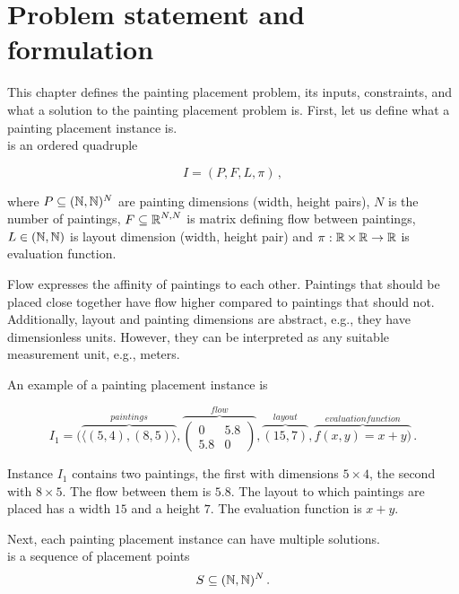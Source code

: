 \chapter{Problem statement and formulation}\label{ch:problem-statement-and-formulation}

This chapter defines the painting placement problem, its inputs, constraints, and what a solution to the painting placement problem is.
First, let us define what a painting placement instance is.\\

 is an ordered quadruple

\begin{equation}
    I = (P, F, L, \pi)\,,
    \label{eq:painting-placement-instance}
\end{equation}

where $P \subseteq (\operatorname*{\mathbb{N}}, \operatorname*{\mathbb{N}})^N$ are painting dimensions (width, height pairs),
$N$ is the number of paintings,
$F \subseteq \operatorname*{\mathbb{R}}^{N, N}$ is matrix defining flow between paintings,
$L \in (\operatorname*{\mathbb{N}}, \operatorname*{\mathbb{N}})$ is layout dimension (width, height pair)
and $\pi: \operatorname*{\mathbb{R}} \times \operatorname*{\mathbb{R}} \to \operatorname*{\mathbb{R}}$ is evaluation function.

Flow expresses the affinity of paintings to each other.
Paintings that should be placed close together have flow higher compared to paintings
that should not.
Additionally, layout and painting dimensions are abstract, e.g., they have dimensionless units.
However, they can be interpreted as any suitable measurement unit, e.g., meters.


An example of a painting placement instance is

\[
    I_1 = (\overbrace{\langle (5,4),(8,5) \rangle}^{paintings},
    \overbrace{\begin{pmatrix}
                   0   & 5.8 \\
                   5.8 & 0
    \end{pmatrix}}^{flow},
    \overbrace{(15,7)}^{layout},
    \overbrace{f(x,y) = x+y)}^{evaluation function}\,.
\]

Instance $I_1$ contains two paintings, the first with dimensions $5\times4$, the second with $8\times5$.
The flow between them is $5.8$.
The layout to which paintings are placed has a width $15$ and a height $7$.
The evaluation function is $x+y$.

Next, each painting placement instance can have multiple solutions.\\

 is a sequence of placement points
\begin{equation}
    S \subseteq (\operatorname*{\mathbb{N}},\operatorname*{\mathbb{N}})^N  \,.
    \label{eq:painting-placement-solution}
\end{equation}

